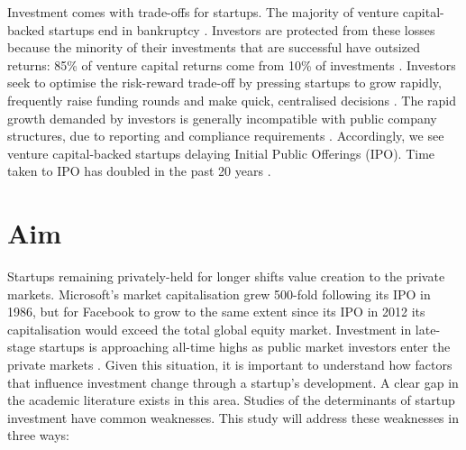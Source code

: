 \documentclass[../thesis/thesis.tex]{subfiles}
\begin{document}
Investment comes with trade-offs for startups. The majority of venture capital-backed startups end in bankruptcy \cite{sahlman2010}. Investors are protected from these losses because the minority of their investments that are successful have outsized returns: 85\% of venture capital returns come from 10\% of investments \cite{sahlman2010}. Investors seek to optimise the risk-reward trade-off by pressing startups to grow rapidly, frequently raise funding rounds and make quick, centralised decisions \cite{fried2006}. The rapid growth demanded by investors is generally incompatible with public company structures, due to reporting and compliance requirements \cite{wies2015}. Accordingly, we see venture capital-backed startups delaying Initial Public Offerings (IPO). Time taken to IPO has doubled in the past 20 years \cite{nvca2016}.


\section*{Aim}

Startups remaining privately-held for longer shifts value creation to the private markets. Microsoft's market capitalisation grew 500-fold following its IPO in 1986, but for Facebook to grow to the same extent since its IPO in 2012 its capitalisation would exceed the total global equity market. Investment in late-stage startups is approaching all-time highs as public market investors enter the private markets \cite{nvca2016}. Given this situation, it is important to understand how factors that influence investment change through a startup's development. A clear gap in the academic literature exists in this area. Studies of the determinants of startup investment have common weaknesses. This study will address these weaknesses in three ways:
\end{document}
